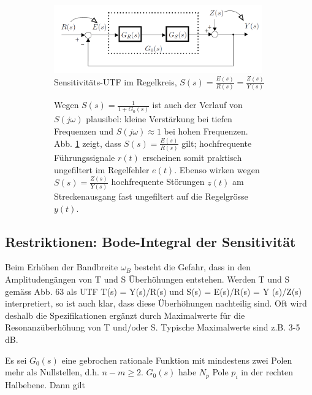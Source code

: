 \begin{figure}[h!]
	\begin{center}
	\begin{subfigure}[b]{9cm}
	\flushleft
			\includegraphics[width=9cm]{./images/SensitivitaetsUTF.png}
\caption{Sensitivitäts-UTF im Regelkreis, $S(s) = \frac{E(s)}{R(s)}=\frac{Z(s)}{Y(s)}$}
			\label{SensitivitaetRegelkreis}
	\end{subfigure}\qquad
	\begin{subfigure}[b]{8cm}
Wegen $S(s) = \frac{1}{1+G_0(s)}$ ist auch der Verlauf von $S(j\omega)$ plausibel: kleine Verstärkung
bei tiefen Frequenzen und $S(j\omega) \approx 1$ bei hohen Frequenzen. Abb. \ref{SensitivitaetRegelkreis} zeigt,
dass $S(s) = \frac{E(s)}{R(s)}$ gilt; hochfrequente Führungssignale $r(t)$ erscheinen somit praktisch
ungefiltert im Regelfehler $e(t)$. Ebenso wirken wegen $S(s) = \frac{Z(s)}{Y(s)}$ hochfrequente Störungen
$z(t)$ am Streckenausgang fast ungefiltert auf die Regelgrösse $y(t)$.

	\end{subfigure}
	\end{center}
\end{figure}



\subsection{Restriktionen: Bode-Integral der Sensitivität }

Beim Erhöhen der Bandbreite $\omega_B$
besteht die Gefahr, dass in den Amplitudengängen von T und S Überhöhungen
entstehen. Werden T und S gemäss Abb. 63 als UTF T(s) = Y(s)/R(s) und
S(s) = E(s)/R(s) = Y (s)/Z(s) interpretiert, so ist auch klar, dass diese Überhöhungen
nachteilig sind. Oft wird deshalb die Spezifikationen ergänzt durch Maximalwerte für die Resonanzüberhöhung von
T und/oder S. Typische Maximalwerte sind z.B. 3-5 dB.

Es sei $G_0(s)$ eine gebrochen rationale Funktion mit mindestens zwei Polen mehr als Nullstellen, d.h. $n - m \geq 2$. $G_0(s)$ habe $N_p$ Pole $p_i$ in der rechten Halbebene. Dann gilt


